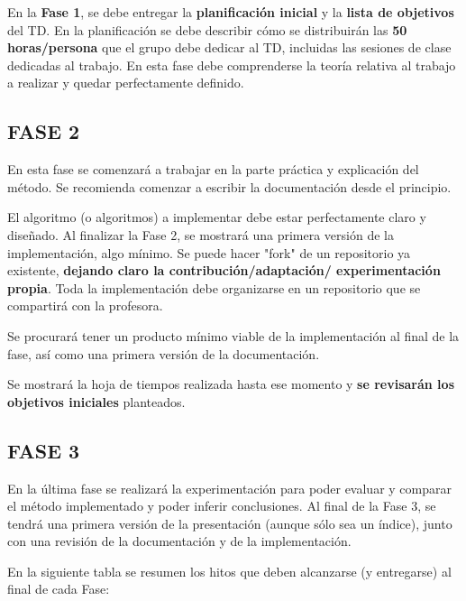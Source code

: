 \documentclass[a4paper]{article}
\theoremstyle{plain} %
\theoremstyle{plain} %
\begin{document}
En la \textbf{Fase 1}, se debe entregar la {\bf planificación inicial} y la {\bf lista de objetivos} del TD. En la planificación se debe describir cómo se distribuirán las {\bf 50 horas/persona} que el grupo debe dedicar al TD, incluidas las sesiones de clase dedicadas al trabajo.  
En esta fase debe comprenderse la teoría relativa al trabajo a realizar y quedar perfectamente definido. 

\subsection*{FASE 2}
En esta fase se comenzará a trabajar en la parte práctica y explicación del método. Se recomienda comenzar a escribir la documentación desde el principio.

El algoritmo (o algoritmos) a implementar debe estar perfectamente claro y diseñado. Al finalizar la Fase 2, se mostrará una primera versión de la implementación, algo mínimo. Se puede hacer "fork" de un repositorio ya existente, {\bf dejando claro la contribución/adaptación/ experimentación propia}. Toda la implementación debe organizarse en un repositorio que se compartirá con la profesora.

Se procurará tener un producto mínimo viable de la implementación al final de la fase, así como una primera versión de la documentación. 

 Se mostrará la hoja de tiempos realizada hasta ese momento y \textbf{se revisarán los objetivos iniciales} planteados.

\subsection*{FASE 3}

En la última fase se realizará la experimentación para poder evaluar y comparar el método implementado y poder inferir conclusiones. Al final de la Fase 3, se tendrá una primera versión de la presentación (aunque sólo sea un índice), junto con una revisión de la documentación y de la implementación. 

\vspace{1cm}
En la siguiente tabla se resumen los hitos que deben alcanzarse (y entregarse) al final de cada Fase: 
\end{document}
